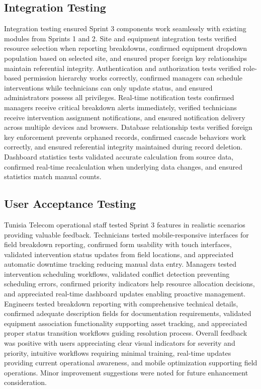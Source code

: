 \subsection{Integration Testing}

Integration testing ensured Sprint 3 components work seamlessly with existing modules from Sprints 1 and 2. Site and equipment integration tests verified resource selection when reporting breakdowns, confirmed equipment dropdown population based on selected site, and ensured proper foreign key relationships maintain referential integrity. Authentication and authorization tests verified role-based permission hierarchy works correctly, confirmed managers can schedule interventions while technicians can only update status, and ensured administrators possess all privileges. Real-time notification tests confirmed managers receive critical breakdown alerts immediately, verified technicians receive intervention assignment notifications, and ensured notification delivery across multiple devices and browsers. Database relationship tests verified foreign key enforcement prevents orphaned records, confirmed cascade behaviors work correctly, and ensured referential integrity maintained during record deletion. Dashboard statistics tests validated accurate calculation from source data, confirmed real-time recalculation when underlying data changes, and ensured statistics match manual counts.

\subsection{User Acceptance Testing}

Tunisia Telecom operational staff tested Sprint 3 features in realistic scenarios providing valuable feedback. Technicians tested mobile-responsive interfaces for field breakdown reporting, confirmed form usability with touch interfaces, validated intervention status updates from field locations, and appreciated automatic downtime tracking reducing manual data entry. Managers tested intervention scheduling workflows, validated conflict detection preventing scheduling errors, confirmed priority indicators help resource allocation decisions, and appreciated real-time dashboard updates enabling proactive management. Engineers tested breakdown reporting with comprehensive technical details, confirmed adequate description fields for documentation requirements, validated equipment association functionality supporting asset tracking, and appreciated proper status transition workflows guiding resolution process. Overall feedback was positive with users appreciating clear visual indicators for severity and priority, intuitive workflows requiring minimal training, real-time updates providing current operational awareness, and mobile optimization supporting field operations. Minor improvement suggestions were noted for future enhancement consideration.

